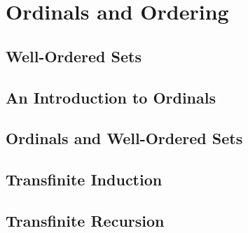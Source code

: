 \section{Ordinals and Ordering}

\subsection{Well-Ordered Sets}

\subsection{An Introduction to Ordinals}


\subsection{Ordinals and Well-Ordered Sets}


\subsection{Transfinite Induction}

\subsection{Transfinite Recursion}